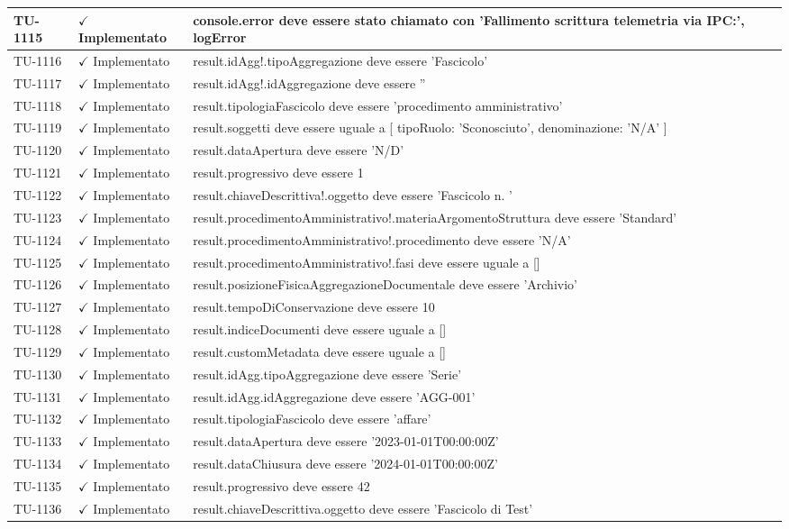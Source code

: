 ﻿\documentclass[a4paper,12pt]{article}
\newcommand{\ok}{\textcolor{green!60!black}{$\checkmark$ Implementato}}
\begin{document}
\begin{longtable}{|p{2cm}|p{3.5cm}|p{9.5cm}|}
\hline
TU-1115 & \ok & console.error deve essere stato chiamato con 'Fallimento scrittura telemetria via IPC:', logError \\
\hline
TU-1116 & \ok & result.idAgg!.tipoAggregazione deve essere 'Fascicolo' \\
\hline
TU-1117 & \ok & result.idAgg!.idAggregazione deve essere '' \\
\hline
TU-1118 & \ok & result.tipologiaFascicolo deve essere 'procedimento amministrativo' \\
\hline
TU-1119 & \ok & result.soggetti deve essere uguale a [{ tipoRuolo: 'Sconosciuto', denominazione: 'N/A' }] \\
\hline
TU-1120 & \ok & result.dataApertura deve essere 'N/D' \\
\hline
TU-1121 & \ok & result.progressivo deve essere 1 \\
\hline
TU-1122 & \ok & result.chiaveDescrittiva!.oggetto deve essere 'Fascicolo n. ' \\
\hline
TU-1123 & \ok & result.procedimentoAmministrativo!.materiaArgomentoStruttura deve essere 'Standard' \\
\hline
TU-1124 & \ok & result.procedimentoAmministrativo!.procedimento deve essere 'N/A' \\
\hline
TU-1125 & \ok & result.procedimentoAmministrativo!.fasi deve essere uguale a [] \\
\hline
TU-1126 & \ok & result.posizioneFisicaAggregazioneDocumentale deve essere 'Archivio' \\
\hline
TU-1127 & \ok & result.tempoDiConservazione deve essere 10 \\
\hline
TU-1128 & \ok & result.indiceDocumenti deve essere uguale a [] \\
\hline
TU-1129 & \ok & result.customMetadata deve essere uguale a [] \\
\hline
TU-1130 & \ok & result.idAgg.tipoAggregazione deve essere 'Serie' \\
\hline
TU-1131 & \ok & result.idAgg.idAggregazione deve essere 'AGG-001' \\
\hline
TU-1132 & \ok & result.tipologiaFascicolo deve essere 'affare' \\
\hline
TU-1133 & \ok & result.dataApertura deve essere '2023-01-01T00:00:00Z' \\
\hline
TU-1134 & \ok & result.dataChiusura deve essere '2024-01-01T00:00:00Z' \\
\hline
TU-1135 & \ok & result.progressivo deve essere 42 \\
\hline
TU-1136 & \ok & result.chiaveDescrittiva.oggetto deve essere 'Fascicolo di Test' \\

\end{longtable}
\end{document}
